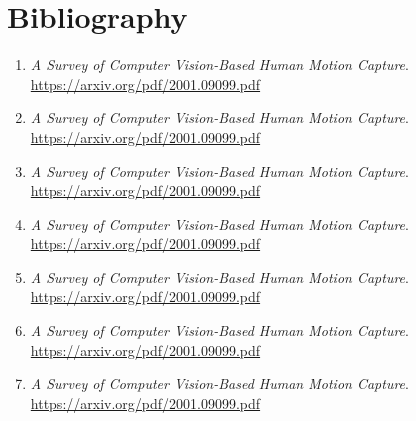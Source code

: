 \section{Bibliography}
\label{sec:bibliography}
\begin{enumerate}
    \item \label{bib:1} \textit{A Survey of Computer Vision-Based Human Motion Capture}. \url{https://arxiv.org/pdf/2001.09099.pdf}
    \item \label{bib:2} \textit{A Survey of Computer Vision-Based Human Motion Capture}. \url{https://arxiv.org/pdf/2001.09099.pdf}
    \item \label{bib:3} \textit{A Survey of Computer Vision-Based Human Motion Capture}. \url{https://arxiv.org/pdf/2001.09099.pdf}
    \item \label{bib:4} \textit{A Survey of Computer Vision-Based Human Motion Capture}. \url{https://arxiv.org/pdf/2001.09099.pdf}
    \item \label{bib:5} \textit{A Survey of Computer Vision-Based Human Motion Capture}. \url{https://arxiv.org/pdf/2001.09099.pdf}
    \item \label{bib:6} \textit{A Survey of Computer Vision-Based Human Motion Capture}. \url{https://arxiv.org/pdf/2001.09099.pdf}
    \item \label{bib:7} \textit{A Survey of Computer Vision-Based Human Motion Capture}. \url{https://arxiv.org/pdf/2001.09099.pdf} 
\end{enumerate}

